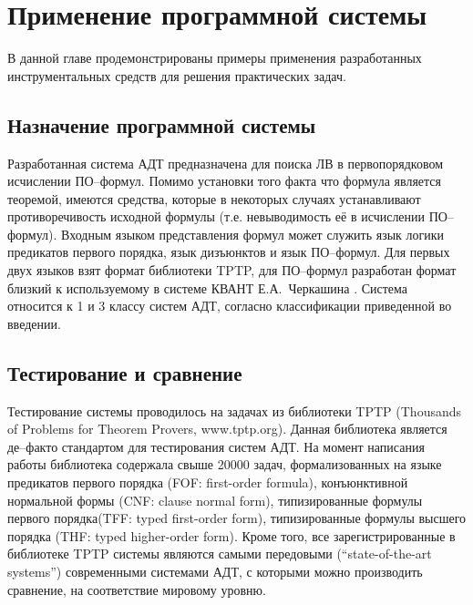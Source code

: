 \chapter{Применение программной системы}
\label{part:examples}

В данной главе продемонстрированы примеры применения разработанных инструментальных средств  для решения практических задач. 

\section{Назначение программной системы}
Разработанная система АДТ предназначена для поиска ЛВ в первопорядковом исчислении ПО--формул. Помимо установки того факта что формула является теоремой, имеются средства, которые в некоторых случаях устанавливают противоречивость исходной формулы (т.е. невыводимость её в исчислении ПО--формул). Входным языком представления формул может служить язык логики предикатов первого порядка, язык дизъюнктов и язык ПО--формул. Для первых двух языков взят формат библиотеки TPTP, для ПО--формул разработан формат близкий к используемому в системе КВАНТ Е.А.~Черкашина \cite{dissChe}. Система относится к 1 и 3 классу систем АДТ, согласно классификации приведенной во введении.




\section{Тестирование и сравнение}

Тестирование системы проводилось на задачах из библиотеки TPTP (Thousands of Problems for Theorem Provers, www.tptp.org). Данная библиотека является де--факто стандартом для тестирования систем АДТ. На момент написания работы библиотека содержала свыше 20000 задач, формализованных на языке предикатов первого порядка (FOF: first-order formula), конъюнктивной нормальной формы (CNF: clause normal form), типизированные формулы первого порядка(TFF: typed first-order form), типизированные формулы высшего порядка (THF: typed higher-order form). Кроме того, все зарегистрированные в библиотеке TPTP системы являются самыми передовыми (``state-of-the-art systems'') современными системами АДТ, с которыми можно производить сравнение, на соответствие мировому уровню.

